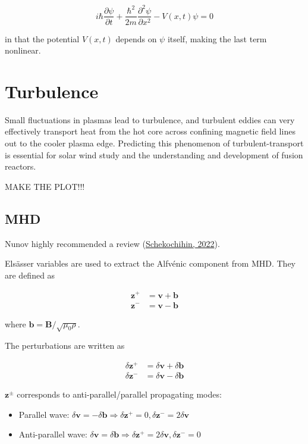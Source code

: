 \documentclass[
  notoc %
]{tufte-book}
\providecommand{\tightlist}{%
  \setlength{\itemsep}{0pt}\setlength{\parskip}{0pt}
}
\begin{document}
\[
i\hbar\frac{\partial\psi}{\partial t} + \frac{\hbar^2}{2m}\frac{\partial^2\psi}{\partial x^2} - V(x,t)\psi = 0
\]

in that the potential \(V(x,t)\) depends on \(\psi\) itself, making the
last term nonlinear.

\hypertarget{sec:turbulence}{%
\chapter{Turbulence}\label{sec:turbulence}}

Small fluctuations in plasmas lead to turbulence, and turbulent eddies
can very effectively transport heat from the hot core across confining
magnetic field lines out to the cooler plasma edge. Predicting this
phenomenon of turbulent-transport is essential for solar wind study and
the understanding and development of fusion reactors.

MAKE THE PLOT!!!

\hypertarget{mhd}{%
\section{MHD}\label{mhd}}

Nunov highly recommended a review
(\protect\hyperlink{ref-schekochihin_2022}{Schekochihin, 2022}).

Elsässer variables are used to extract the Alfvénic component from MHD.
They are defined as

\[
\begin{aligned}
\mathbf{z}^+ &= \mathbf{v} + \mathbf{b} \\
\mathbf{z}^- &= \mathbf{v} - \mathbf{b}
\end{aligned}
\]

where \(\mathbf{b} = \mathbf{B}/\sqrt{\mu_0\rho}\).

The perturbations are written as

\[
\begin{aligned}
\delta\mathbf{z}^+ &= \delta\mathbf{v} + \delta\mathbf{b} \\
\delta\mathbf{z}^- &= \delta\mathbf{v} - \delta\mathbf{b}
\end{aligned}
\]

\(\mathbf{z}^\pm\) corresponds to anti-parallel/parallel propagating
modes:

\begin{itemize}
\tightlist
\item
  Parallel wave:
  \(\delta\mathbf{v}=-\delta\mathbf{b}\Rightarrow \delta\mathbf{z}^+=0, \delta\mathbf{z}^-=2\delta\mathbf{v}\)
\item
  Anti-parallel wave:
  \(\delta\mathbf{v}=\delta\mathbf{b}\Rightarrow \delta\mathbf{z}^+=2\delta\mathbf{v}, \delta\mathbf{z}^-=0\)
\end{itemize}
\end{document}
